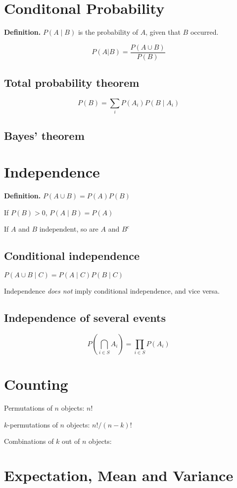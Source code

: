 
\section{Conditonal Probability}
\textbf{Definition.} $P(A \mid B)$ is the probability of $A$, given that $B$ occurred.

$$P(A|B) = \frac{P(A \cup B)}{P(B)}$$

\subsection*{Total probability theorem}

$$P(B) = \sum_{i} P(A_i) P(B \mid A_i)$$
\subsection*{Bayes' theorem}

\section{Independence}
\textbf{Definition.} $P(A \cup B) = P(A) P(B)$

If $P(B) > 0$, $P(A \mid B) = P(A)$

If $A$ and $B$ independent, so are $A$ and $B^c$

\subsection*{Conditional independence}
$P(A \cup B \mid C) = P(A \mid C) P(B \mid C)$

Independence \textit{does not} imply conditional independence, and vice versa.

\subsection*{Independence of several events}

$$P \left( \bigcap_{i \in S} A_i \right) = \prod_{i \in S}P(A_i)$$

\section{Counting}
Permutations of $n$ objects: $n!$

$k$-permutations of $n$ objects: $n!/(n-k)!$

Combinations of $k$ out of $n$ objects:

\section{Expectation, Mean and Variance}
